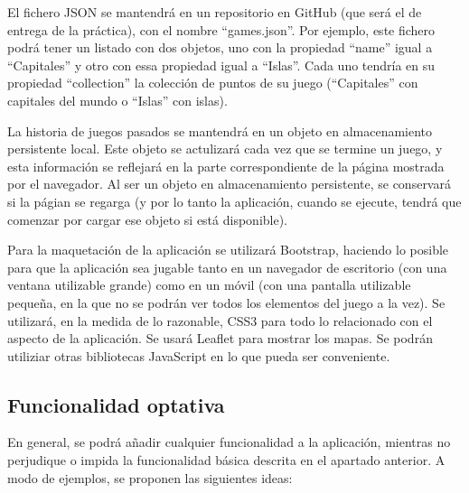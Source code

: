 El fichero JSON se mantendrá en un repositorio en GitHub (que será el de entrega de la práctica), con el nombre ``games.json''. Por ejemplo, este fichero podrá tener un listado con dos objetos, uno con la propiedad ``name'' igual a  ``Capitales'' y otro con essa propiedad igual a ``Islas''. Cada uno tendría en su propiedad ``collection'' la colección de puntos de su juego (``Capitales'' con capitales del mundo o ``Islas'' con islas).

La historia de juegos pasados se mantendrá en un objeto en almacenamiento persistente local. Este objeto se actulizará cada vez que se termine un juego, y esta información se reflejará en la parte correspondiente de la página mostrada por el navegador. Al ser un objeto en almacenamiento persistente, se conservará si la págian se regarga (y por lo tanto la aplicación, cuando se ejecute, tendrá que comenzar por cargar ese objeto si está disponible).

Para la maquetación de la aplicación se utilizará Bootstrap, haciendo lo posible para que la aplicación sea jugable tanto en un navegador de escritorio (con una ventana utilizable grande) como en un móvil (con una pantalla utilizable pequeña, en la que no se podrán ver todos los elementos del juego a la vez). Se utilizará, en la medida de lo razonable, CSS3 para todo lo relacionado con el aspecto de la aplicación. Se usará Leaflet para mostrar los mapas. Se podrán utiliziar otras bibliotecas JavaScript en lo que pueda ser conveniente.

\subsection{Funcionalidad optativa}

En general, se podrá añadir cualquier funcionalidad a la aplicación, mientras no perjudique o impida la funcionalidad básica descrita en el apartado anterior. A modo de ejemplos, se proponen las siguientes ideas:

